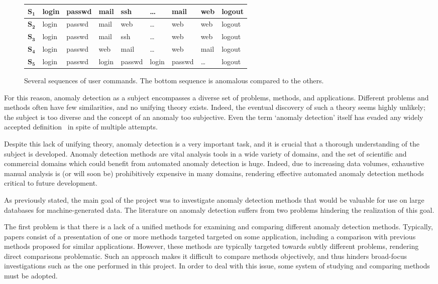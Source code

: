 \begin{figure}[htb]
    \centering
    \begin{tabular}{| l | l l l l l l l l |}
        \hline
        $\mathbf{S_1}$ & login & passwd & mail & ssh & \dots & mail & web & logout \\ \hline
        $\mathbf{S_2}$ & login & passwd & mail & web & \dots & web & web & logout \\ \hline
        $\mathbf{S_3}$ & login & passwd & mail & ssh & \dots & web & web & logout \\ \hline
        $\mathbf{S_4}$ & login & passwd & web & mail & \dots & web & mail & logout \\ \hline
        $\mathbf{S_5}$ & login & passwd & login & passwd & login & passwd & \dots & logout \\\hline
    \end{tabular}
    \caption{Several sequences of user commands. The bottom sequence is anomalous compared to the others.}
\label{fig:example1}
\end{figure}

For this reason, anomaly detection as a subject encompasses a diverse set of problems, methods, and applications. Different problems and methods often have few similarities, and no unifying theory exists. Indeed, the eventual discovery of such a theory seems highly unlikely; the subject is too diverse and the concept of an anomaly too subjective. Even the term `anomaly detection' itself has evaded any widely accepted definition~\cite{hodge} in spite of multiple attempts.

Despite this lack of unifying theory, anomaly detection is a very important task, and it is crucial that a thorough understanding of the subject is developed. Anomaly detection methods are vital analysis tools in a wide variety of domains, and the set of scientific and commercial domains which could benefit from automated anomaly detection is huge. Indeed, due to increasing data volumes, exhaustive manual analysis is (or will soon be) prohibitively expensive in many domains, rendering effective automated anomaly detection methods critical to future development.

As previously stated, the main goal of the project was to investigate anomaly detection methods that would be valuable for use on large databases for machine-generated data. The literature on anomaly detection suffers from two problems hindering the realization of this goal.

The first problem is that there is a lack of a unified methods for examining and comparing different anomaly detection methods. Typically, papers consist of a presentation of one or more methods targeted targeted on some application, including a comparison  with previous methods proposed for similar applications. However, these methods are typically targeted towards subtly different problems, rendering direct comparisons problematic. Such an approach makes it difficult to compare methods objectively, and thus hinders broad-focus investigations such as the one performed in this project. In order to deal with this issue, some system of studying and comparing methods must be adopted.

